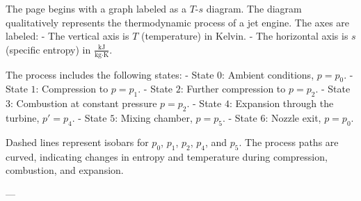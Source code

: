 The page begins with a graph labeled as a \( T \)-\( s \) diagram. The diagram qualitatively represents the thermodynamic process of a jet engine. The axes are labeled:  
- The vertical axis is \( T \) (temperature) in Kelvin.  
- The horizontal axis is \( s \) (specific entropy) in \( \frac{\text{kJ}}{\text{kg·K}} \).  

The process includes the following states:  
- State \( 0 \): Ambient conditions, \( p = p_0 \).  
- State \( 1 \): Compression to \( p = p_1 \).  
- State \( 2 \): Further compression to \( p = p_2 \).  
- State \( 3 \): Combustion at constant pressure \( p = p_2 \).  
- State \( 4 \): Expansion through the turbine, \( p' = p_4 \).  
- State \( 5 \): Mixing chamber, \( p = p_5 \).  
- State \( 6 \): Nozzle exit, \( p = p_0 \).  

Dashed lines represent isobars for \( p_0 \), \( p_1 \), \( p_2 \), \( p_4 \), and \( p_5 \). The process paths are curved, indicating changes in entropy and temperature during compression, combustion, and expansion.  

---